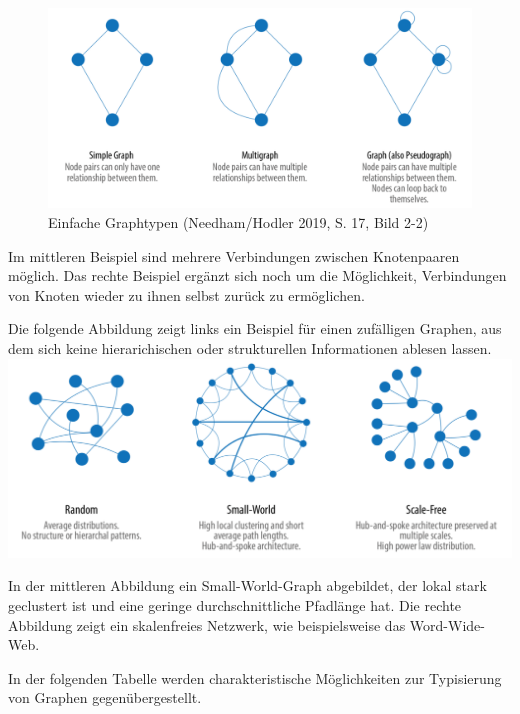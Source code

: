 \documentclass[ngerman,]{scrreprt}
\begin{document}
\begin{figure}
\centering
\includegraphics{Bilder/Graph-Algorithms/17-2-2-TypesOfGraphs.png}
\caption{Einfache Graphtypen (Needham/Hodler 2019, S. 17, Bild 2-2)}
\end{figure}

Im mittleren Beispiel sind mehrere Verbindungen zwischen Knotenpaaren möglich. Das rechte Beispiel ergänzt sich noch um die Möglichkeit, Verbindungen von Knoten wieder zu ihnen selbst zurück zu ermöglichen.

Die folgende Abbildung zeigt links ein Beispiel für einen zufälligen Graphen, aus dem sich keine hierarichischen oder strukturellen Informationen ablesen lassen. \includegraphics{Bilder/Graph-Algorithms/17-2-3-RandomSmallWorldScaleFree.png}

In der mittleren Abbildung ein Small-World-Graph abgebildet, der lokal stark geclustert ist und eine geringe durchschnittliche Pfadlänge hat. Die rechte Abbildung zeigt ein skalenfreies Netzwerk, wie beispielsweise das Word-Wide-Web.

In der folgenden Tabelle werden charakteristische Möglichkeiten zur Typisierung von Graphen gegenübergestellt.
\end{document}
